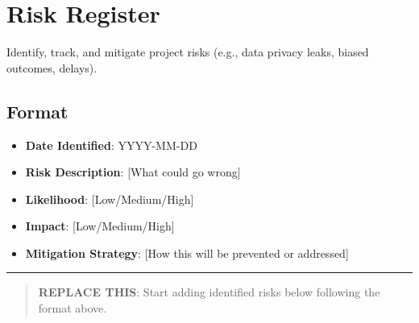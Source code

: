 \documentclass[
]{report}
\author{}
\date{}
\providecommand{\tightlist}{%
  \setlength{\itemsep}{0pt}\setlength{\parskip}{0pt}}
\renewcommand*\contentsname{Table of contents}
\newcommand\contentsname{Table of contents}
\begin{document}
\renewcommand*\contentsname{Table of contents}
{
\hypersetup{linkcolor=}
\setcounter{tocdepth}{2}
\tableofcontents
}

\chapter{Risk Register}\label{risk-register}

Identify, track, and mitigate project risks (e.g., data privacy leaks,
biased outcomes, delays).

\section{Format}\label{format}

\begin{itemize}
\tightlist
\item
  \textbf{Date Identified}: YYYY-MM-DD
\item
  \textbf{Risk Description}: {[}What could go wrong{]}
\item
  \textbf{Likelihood}: {[}Low/Medium/High{]}
\item
  \textbf{Impact}: {[}Low/Medium/High{]}
\item
  \textbf{Mitigation Strategy}: {[}How this will be prevented or
  addressed{]}
\end{itemize}

\begin{center}\rule{0.5\linewidth}{0.5pt}\end{center}

\begin{quote}
\textbf{REPLACE THIS}: Start adding identified risks below following the
format above.
\end{quote}
\end{document}
